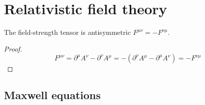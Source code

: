 \section{Relativistic field theory}

\begin{lemma}
	The field-strength tensor is antisymmetric $F^{\mu\nu}=-F^{\nu\mu}$.
\end{lemma}
\begin{proof}
	\begin{equation*}
		F^{\mu\nu}
		=
		\partial^\mu A^\nu
		-
		\partial^\nu A^\mu
		=
		-
		\left(
			\partial^\nu A^\mu
			-
			\partial^\mu A^\nu
		\right)
		=
		-
		F^{\nu\mu}
	\end{equation*}
\end{proof}

\subsection{Maxwell equations}

